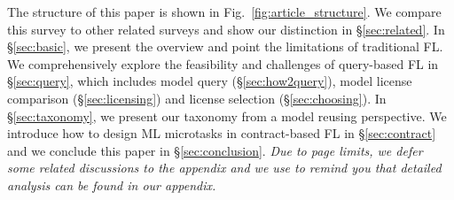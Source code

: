 The structure of this paper is shown in Fig.~\ref{fig:article_structure}. 
We compare this survey to other related surveys and show our distinction in \S\ref{sec:related}. 
In \S\ref{sec:basic}, we present the overview and point the limitations of traditional FL.
We comprehensively explore the feasibility and challenges of query-based FL in \S\ref{sec:query}, which includes model query (\S\ref{sec:how2query}), model license comparison (\S\ref{sec:licensing}) and license selection (\S\ref{sec:choosing}).
In \S\ref{sec:taxonomy}, we present our taxonomy from a model reusing perspective.
We introduce how to design ML microtasks in contract-based FL in \S\ref{sec:contract} and we conclude this paper in \S\ref{sec:conclusion}.
\emph{Due to page limits, we defer some related discussions to the appendix and we use \ddag{} to remind you that detailed analysis can be found in our appendix.}

